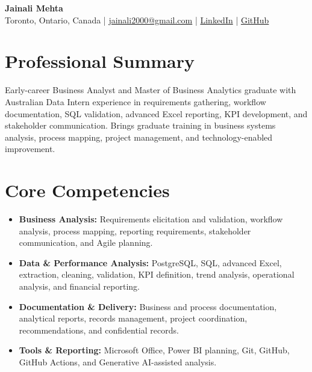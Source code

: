 \documentclass[letterpaper,10pt]{article}
\begin{document}
\begin{center}
  {\fontsize{17}{19}\selectfont\textbf{Jainali Mehta}}\\[2pt]
  \small Toronto, Ontario, Canada \;|\;
  \href{mailto:jainali2000@gmail.com}{jainali2000@gmail.com} \;|\;
  \href{https://www.linkedin.com/in/jainali-mehta}{LinkedIn} \;|\;
  \href{https://github.com/jainalimehta}{GitHub}
\end{center}
\vspace{-7pt}

\section{Professional Summary}
\small Early-career Business Analyst and Master of Business Analytics graduate with Australian Data Intern experience in requirements gathering, workflow documentation, SQL validation, advanced Excel reporting, KPI development, and stakeholder communication. Brings graduate training in business systems analysis, process mapping, project management, and technology-enabled improvement.

\section{Core Competencies}
\begin{itemize}[leftmargin=0.16in,label=\textbullet,topsep=0pt,itemsep=1pt,parsep=0pt]
  \item \small \textbf{Business Analysis:} Requirements elicitation and validation, workflow analysis, process mapping, reporting requirements, stakeholder communication, and Agile planning.
  \item \small \textbf{Data \& Performance Analysis:} PostgreSQL, SQL, advanced Excel, extraction, cleaning, validation, KPI definition, trend analysis, operational analysis, and financial reporting.
  \item \small \textbf{Documentation \& Delivery:} Business and process documentation, analytical reports, records management, project coordination, recommendations, and confidential records.
  \item \small \textbf{Tools \& Reporting:} Microsoft Office, Power BI planning, Git, GitHub, GitHub Actions, and Generative AI-assisted analysis.
\end{itemize}
\end{document}
